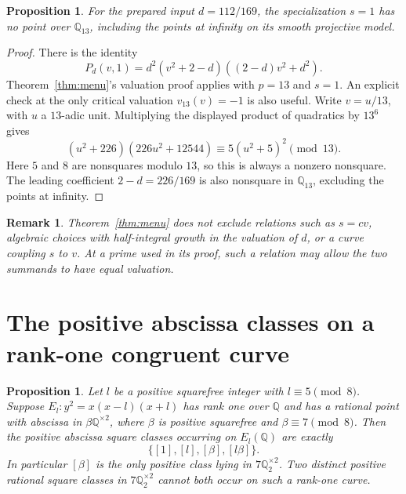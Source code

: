 \documentclass[11pt,a4paper]{article}
\newtheorem{proposition}[theorem]{Proposition}
\newtheorem{remark}[theorem]{Remark}
\newcommand{\Q}{\mathbb Q}
\begin{document}
\begin{proposition}\label{prop:small}
For the prepared input $d=112/169$, the specialization $s=1$ has no point over $\Q_{13}$, including the points at infinity on its smooth projective model.
\end{proposition}
\begin{proof}
There is the identity
\[
 P_d(v,1)=d^2(v^2+2-d)((2-d)v^2+d^2).
\]
Theorem~\ref{thm:menu}'s valuation proof applies with $p=13$ and $s=1$. An explicit check at the only critical valuation $v_{13}(v)=-1$ is also useful. Write $v=u/13$, with $u$ a $13$-adic unit. Multiplying the displayed product of quadratics by $13^6$ gives
\[
 (u^2+226)(226u^2+12544)
 \equiv5(u^2+5)^2\pmod{13}.
\]
Here $5$ and $8$ are nonsquares modulo $13$, so this is always a nonzero nonsquare. The leading coefficient $2-d=226/169$ is also nonsquare in $\Q_{13}$, excluding the points at infinity.
\end{proof}

\begin{remark}
Theorem~\ref{thm:menu} does not exclude relations such as $s=cv$, algebraic choices with half-integral growth in the valuation of $d$, or a curve coupling $s$ to $v$. At a prime used in its proof, such a relation may allow the two summands to have equal valuation.
\end{remark}

\section{The positive abscissa classes on a rank-one congruent curve}

\begin{proposition}\label{prop:rankone}
Let $l$ be a positive squarefree integer with $l\equiv5\pmod8$. Suppose $E_l:y^2=x(x-l)(x+l)$ has rank one over $\Q$ and has a rational point with abscissa in $\beta\Q^{\times2}$, where $\beta$ is positive squarefree and $\beta\equiv7\pmod8$. Then the positive abscissa square classes occurring on $E_l(\Q)$ are exactly
\[
 \{[1],[l],[\beta],[l\beta]\}.
\]
In particular $[\beta]$ is the only positive class lying in $7\Q_2^{\times2}$. Two distinct positive rational square classes in $7\Q_2^{\times2}$ cannot both occur on such a rank-one curve.
\end{proposition}
\end{document}
